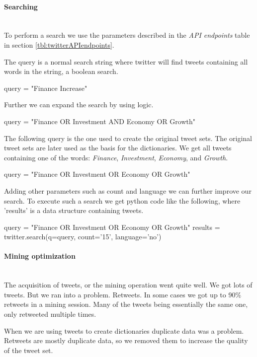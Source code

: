 \paragraph{Searching}
\hspace{0pt}\\
To perform a search we use the parameters described in the \textit{API
endpoints} table in section \ref{tbl:twitterAPIendpoints}.

The query is a normal search string where twitter will
find tweets containing all words in the string, a boolean search. 
\begin{python}
query = "Finance Increase"
\end{python}

Further we can expand the search by using logic. 
\begin{python}
query = "Finance OR Investment AND Economy OR Growth"
\end{python}

The following query is the one used to create the original tweet sets. The
original tweet sets are later used as the basis for the dictionaries.
We get all tweets containing one of the words: \textit{Finance}, \textit{Investment}, \textit{Economy}, and \textit{Growth}.
\begin{python}
query = "Finance OR Investment OR Economy OR Growth"
\end{python}

Adding other parameters such as count and language we can further improve our
search. To execute such a search we get python code like the following, where
'results' is a data structure containing tweets.
\begin{python}
query = "Finance OR Investment OR Economy OR Growth"
results = twitter.search(q=query, count='15', language='no')
\end{python}
%

\paragraph{Mining optimization}
\hspace{0pt}\\
The acquisition of tweets, or the mining operation went quite well. We got lots
of tweets. But we ran into a problem. Retweets. In some cases we got up to 90\%
retweets in a mining session. Many of the tweets being essentially the same
one, only retweeted multiple times. 

When we are using tweets to create dictionaries duplicate data was a problem.
Retweets are mostly duplicate data, so we removed them to increase the quality
of the tweet set.

